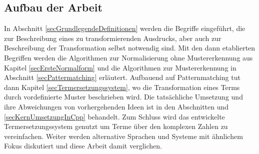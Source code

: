 \subsection{Aufbau der Arbeit}
In Abschnitt \ref{secGrundlegendeDefinitionen} werden die Begriffe eingeführt, die zur Beschreibung eines zu transformierenden Ausdrucks, aber auch zur Beschreibung der Transformation selbst notwendig sind. Mit den dann etablierten Begriffen werden die Algorithmen zur Normalisierung ohne Mustererkennung aus Kapitel \ref{secErsteNormalform} und die Algorithmen zur Mustererkennung in Abschnitt \ref{secPattermatching} erläutert. Aufbauend auf Patternmatching tut dann Kapitel \ref{secTermersetzungssystem}, wo die Transformation eines Terms durch vordefinierte Muster beschrieben wird.
Die tatsächliche Umsetzung und ihre Abweichungen von vorhergehenden Ideen ist in den Abschnitten  und \ref{secKernUmsetzungInCpp} behandelt. 
Zum Schluss wird das entwickelte Termersetzungssystem genutzt um Terme über den komplexen Zahlen zu vereinfachen. Weiter werden alternative Sprachen und Systeme mit ähnlichem Fokus diskutiert und diese Arbeit damit verglichen.



